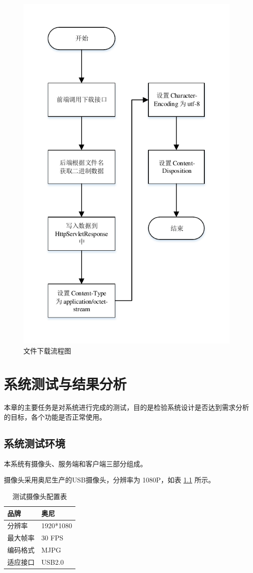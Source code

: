 \begin{figure}[t]
    \centering
    \includegraphics[width=0.8\linewidth]{./Figure/IMG_seq_download.pdf}
    \caption{文件下载流程图}\label{Fig:seq_download}
\end{figure}

\chapter{系统测试与结果分析}
本章的主要任务是对系统进行完成的测试，目的是检验系统设计是否达到需求分析的目标，各个功能是否正常使用。

\section{系统测试环境}
本系统有摄像头、服务端和客户端三部分组成。

摄像头采用奥尼生产的USB摄像头，分辨率为 1080P，如表 \ref{Tab:cam} 所示。
\begin{longtable}[ht]{|l|l|}
    \caption{测试摄像头配置表}
    \label{Tab:cam}\\
    \hline
    品牌&奥尼\\
    \hline
    分辨率&1920*1080\\
    \hline
    最大帧率&30 FPS\\
    \hline
    编码格式&MJPG \\
    \hline
    适应接口&USB2.0\\
    \hline
    \end{longtable}

